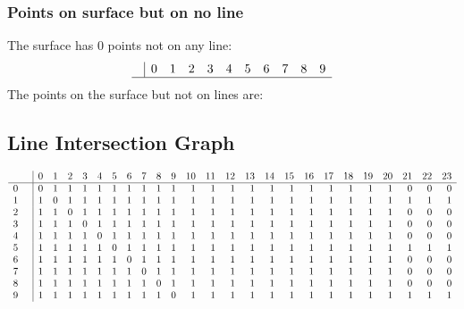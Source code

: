 \documentclass{article}
\begin{document}
{\subsubsection*{Points on surface but on no line}
The surface has 0 points not on any line:\\
$$
\begin{array}{r|*{10}{r}}
 & 0 & 1 & 2 & 3 & 4 & 5 & 6 & 7 & 8 & 9\\
\hline
\end{array}
$$
The points on the surface but not on lines are:\\
\begin{multicols}{2}
\noindent
\end{multicols}
\subsection*{Line Intersection Graph}
{\arraycolsep=1pt
$$
\begin{array}{rr|*{24}r}
 &  & 0 & 1 & 2 & 3 & 4 & 5 & 6 & 7 & 8 & 9 & 10 & 11 & 12 & 13 & 14 & 15 & 16 & 17 & 18 & 19 & 20 & 21 & 22 & 23\\
\hline
0 &  & 0 & 1 & 1 & 1 & 1 & 1 & 1 & 1 & 1 & 1 & 1 & 1 & 1 & 1 & 1 & 1 & 1 & 1 & 1 & 1 & 1 & 0 & 0 & 0\\
1 &  & 1 & 0 & 1 & 1 & 1 & 1 & 1 & 1 & 1 & 1 & 1 & 1 & 1 & 1 & 1 & 1 & 1 & 1 & 1 & 1 & 1 & 1 & 1 & 1\\
2 &  & 1 & 1 & 0 & 1 & 1 & 1 & 1 & 1 & 1 & 1 & 1 & 1 & 1 & 1 & 1 & 1 & 1 & 1 & 1 & 1 & 1 & 0 & 0 & 0\\
3 &  & 1 & 1 & 1 & 0 & 1 & 1 & 1 & 1 & 1 & 1 & 1 & 1 & 1 & 1 & 1 & 1 & 1 & 1 & 1 & 1 & 1 & 0 & 0 & 0\\
4 &  & 1 & 1 & 1 & 1 & 0 & 1 & 1 & 1 & 1 & 1 & 1 & 1 & 1 & 1 & 1 & 1 & 1 & 1 & 1 & 1 & 1 & 0 & 0 & 0\\
5 &  & 1 & 1 & 1 & 1 & 1 & 0 & 1 & 1 & 1 & 1 & 1 & 1 & 1 & 1 & 1 & 1 & 1 & 1 & 1 & 1 & 1 & 1 & 1 & 1\\
6 &  & 1 & 1 & 1 & 1 & 1 & 1 & 0 & 1 & 1 & 1 & 1 & 1 & 1 & 1 & 1 & 1 & 1 & 1 & 1 & 1 & 1 & 0 & 0 & 0\\
7 &  & 1 & 1 & 1 & 1 & 1 & 1 & 1 & 0 & 1 & 1 & 1 & 1 & 1 & 1 & 1 & 1 & 1 & 1 & 1 & 1 & 1 & 0 & 0 & 0\\
8 &  & 1 & 1 & 1 & 1 & 1 & 1 & 1 & 1 & 0 & 1 & 1 & 1 & 1 & 1 & 1 & 1 & 1 & 1 & 1 & 1 & 1 & 0 & 0 & 0\\
9 &  & 1 & 1 & 1 & 1 & 1 & 1 & 1 & 1 & 1 & 0 & 1 & 1 & 1 & 1 & 1 & 1 & 1 & 1 & 1 & 1 & 1 & 1 & 1 & 1\\

\end{array}$$}}
\end{document}
